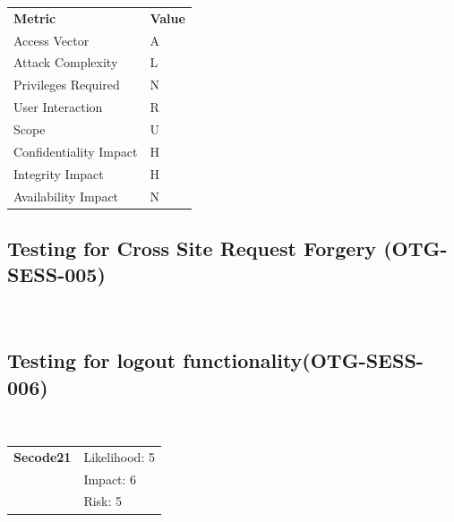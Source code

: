 \documentclass[headsepline,footsepline,footinclude=false,oneside,fontsize=11pt,paper=a4,listof=totoc,bibliography=totoc]{scrbook} %
\begin{document}
\begin{center}
	\begin{tabular}{ll}
		\rowcolor[HTML]{34CDF9}
		{\color[HTML]{ECF4FF} \textbf{Metric}}        & {\color[HTML]{ECF4FF} \textbf{Value}} \\
		\rowcolor[HTML]{BBDAFF}
		{\color[HTML]{333333} Access Vector}          & {\color[HTML]{333333} } A             \\
		\rowcolor[HTML]{ECF4FF}
		{\color[HTML]{333333} Attack Complexity}      & {\color[HTML]{333333} } L              \\
		\rowcolor[HTML]{BBDAFF}
		{\color[HTML]{333333} Privileges Required}    & {\color[HTML]{333333} } N              \\
		\rowcolor[HTML]{ECF4FF}
		{\color[HTML]{333333} User Interaction}       & {\color[HTML]{333333} } R              \\
		\rowcolor[HTML]{BBDAFF}
		{\color[HTML]{333333} Scope}                  & {\color[HTML]{333333} } U              \\
		\rowcolor[HTML]{ECF4FF}
		{\color[HTML]{333333} Confidentiality Impact} & {\color[HTML]{333333} } H              \\
		\rowcolor[HTML]{BBDAFF}
		{\color[HTML]{333333} Integrity Impact}       & {\color[HTML]{333333} } H              \\
		\rowcolor[HTML]{ECF4FF}
		{\color[HTML]{333333} Availability Impact}    & {\color[HTML]{333333} } N
	\end{tabular}
\end{center}

\pagebreak
\subsection{Testing for Cross Site Request Forgery (OTG-SESS-005)}\


\pagebreak
\subsection{Testing for logout functionality(OTG-SESS-006)}\

\begin{tabular}{cR{12cm}}
	\textbf{Secode21} & Likelihood: 5\\& Impact: 6\\& Risk: 5
\end{tabular}
\end{document}
